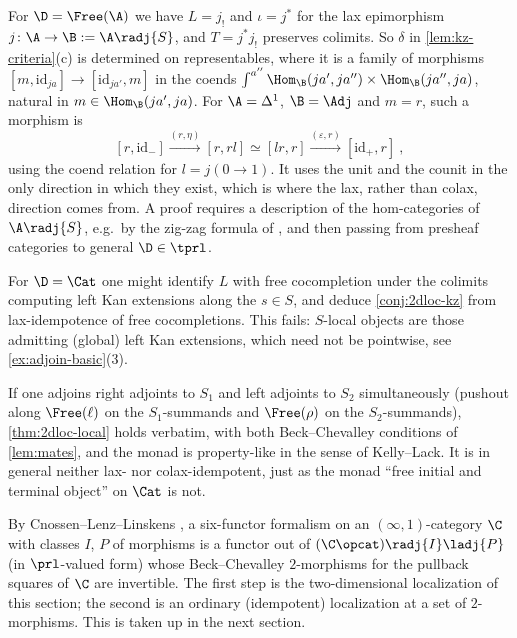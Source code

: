 \begin{rmk}
\label{rmk:kz-universal}
For $\D = \Free(\A)$ we have $L = j_{!}$ and $\iota = j^{*}$ for the lax epimorphism $j\colon \A \to \B := \A\radj{S}$, and $T = j^{*}j_{!}$ preserves colimits. So $\delta$ in \cref{lem:kz-criteria}(c) is determined on representables, where it is a family of morphisms $[m,\mathrm{id}_{ja}] \to [\mathrm{id}_{ja'},m]$ in the coends $\int^{a''}\Hom_{\B}(ja',ja'') \times \Hom_{\B}(ja'',ja)$, natural in $m \in \Hom_{\B}(ja',ja)$.
For $\A = \Delta^{1}$, $\B = \Adj$ and $m = r$, such a morphism is
\[
[r,\mathrm{id}_{-}] \xrightarrow{(r,\eta)} [r,rl] \simeq [lr,r] \xrightarrow{(\varepsilon,r)} [\mathrm{id}_{+},r] \ ,
\]
using the coend relation for $l = j(0 \to 1)$. It uses the unit and the counit in the only direction in which they exist, which is where the lax, rather than colax, direction comes from. A proof requires a description of the hom-categories of $\A\radj{S}$, e.g.\ by the zig-zag formula of \cite{abellan2026bifibrations}, and then passing from presheaf categories to general $\D \in \tprl$.
\end{rmk}

\begin{rmk}
\label{rmk:kz-not-pointwise}
For $\D = \Cat$ one might identify $L$ with free cocompletion under the colimits computing left Kan extensions along the $s \in S$, and deduce \cref{conj:2dloc-kz} from lax-idempotence of free cocompletions. This fails: $S$-local objects are those admitting (global) left Kan extensions, which need not be pointwise, see \cref{ex:adjoin-basic}(3).
\end{rmk}

\begin{rmk}
\label{rmk:2dloc-two-sided}
If one adjoins right adjoints to $S_{1}$ and left adjoints to $S_{2}$ simultaneously (pushout along $\Free(\ell)$ on the $S_{1}$-summands and $\Free(\rho)$ on the $S_{2}$-summands), \cref{thm:2dloc-local} holds verbatim, with both Beck--Chevalley conditions of \cref{lem:mates}, and the monad is property-like in the sense of Kelly--Lack. It is in general neither lax- nor colax-idempotent, just as the monad ``free initial and terminal object'' on $\Cat$ is not.
\end{rmk}

\begin{rmk}
\label{rmk:2dloc-6ff}
By Cnossen--Lenz--Linskens \cite{cnossenlenzlinskens2025universal}, a six-functor formalism on an $(\infty,1)$-category $\C$ with classes $I$, $P$ of morphisms is a functor out of $(\C\opcat)\radj{I}\ladj{P}$ (in $\prl$-valued form) whose Beck--Chevalley $2$-morphisms for the pullback squares of $\C$ are invertible. The first step is the two-dimensional localization of this section; the second is an ordinary (idempotent) localization at a set of $2$-morphisms. This is taken up in the next section.
\end{rmk}
